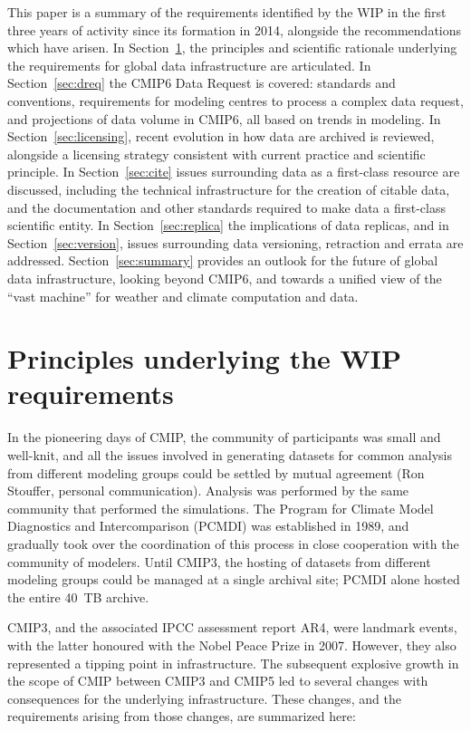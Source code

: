 \documentclass[gmd,manuscript]{copernicus}
\newcommand{\secref}[1] {\mbox{Section  \ref{sec:#1}}}
\begin{document}
This paper is a summary of the requirements identified
by the WIP in the first three years of activity since its formation in 2014, 
alongside the recommendations which have
arisen. In \secref{principles},  the principles and scientific rationale underlying the
requirements for global data infrastructure are articulated. In
\secref{dreq} the CMIP6 Data Request is covered: standards and
conventions, requirements for modeling centres to process a complex
data request, and projections of data volume in CMIP6, all based on
trends in modeling. In \secref{licensing}, recent evolution
in how data are archived is reviewed, alongside a licensing strategy consistent
with current practice and scientific principle. In \secref{cite}  issues surrounding data as a first-class resource are discussed, including
the technical infrastructure for the creation of citable data, and the
documentation and other standards required to make data a first-class
scientific entity. In \secref{replica} the implications of
data replicas, and in \secref{version}, issues surrounding data
versioning, retraction and errata are addressed.  \secref{summary} provides 
an outlook for the future of global data infrastructure, looking
beyond CMIP6, and towards a unified view of the ``vast machine'' for
weather and climate computation and data.

\section{Principles underlying the WIP requirements}
\label{sec:principles}

In the pioneering days of CMIP, the community of participants was
small and well-knit, and all the issues involved in generating
datasets for common analysis from different modeling groups could be
settled by mutual agreement (Ron Stouffer, personal communication).
Analysis was performed by the same community that performed the
simulations. The Program for Climate Model Diagnostics and
Intercomparison (PCMDI) was established in 1989, and gradually took
over the coordination of this process in close cooperation with the
community of modelers. Until CMIP3, the hosting of datasets from
different modeling groups could be managed at a single archival site;
PCMDI alone hosted the entire 40~TB archive.

CMIP3, and the associated IPCC assessment report AR4, were landmark events,
with the latter honoured with the Nobel Peace Prize in 2007.  However,
they also represented a tipping point in infrastructure. The subsequent explosive
growth in the scope of CMIP between CMIP3 and CMIP5  led to
several changes with consequences for the underlying infrastructure.
These changes, and the requirements arising
from those changes, are summarized here:
\end{document}
